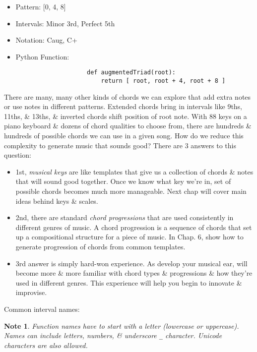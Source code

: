 \documentclass{article}
\newtheorem{note}{Note}
\begin{document}
\begin{itemize}
\begin{itemize}
\begin{itemize}
			\begin{itemize}
				\item Pattern: [0, 4, 8]
				\item Intervals: Minor 3rd, Perfect 5th
				\item Notation: Caug, C+
				\item Python Function:
				\begin{verbatim}
					def augmentedTriad(root):
					    return [ root, root + 4, root + 8 ]
				\end{verbatim}
			\end{itemize}
			There are many, many other kinds of chords we can explore that add extra notes or use notes in different patterns. Extended chords bring in intervals like 9ths, 11ths, \& 13ths, \& inverted chords shift position of root note. With 88 keys on a piano keyboard \& dozens of chord qualities to choose from, there are hundreds \& hundreds of possible chords we can use in a given song. How do we reduce this complexity to generate music that sounds good? There are 3 answers to this question:
			\begin{itemize}
				\item 1st, {\it musical keys} are like templates that give us a collection of chords \& notes that will sound good together. Once we know what key we're in, set of possible chords becomes much more manageable. Next chap will cover main ideas behind keys \& scales.
				\item 2nd, there are standard {\it chord progressions} that are used consistently in different genres of music. A chord progression is a sequence of chords that set up a compositional structure for a piece of music. In Chap. 6, show how to generate progression of chords from common templates.
				\item 3rd answer is simply hard-won experience. As develop your musical ear, will become more \& more familiar with chord types \& progressions \& how they're used in different genres. This experience will help you begin to innovate \& improvise.
			\end{itemize}
			Common interval names: {}
		\end{itemize}
		\begin{note}
			Function names have to start with a letter (lowercase or uppercase). Names can include letters, numbers, \& underscore \verb|_| character. Unicode characters are also allowed.
		\end{note}
	\end{itemize}

\end{itemize}
\end{document}
